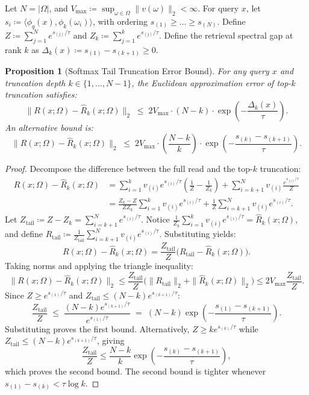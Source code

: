 \documentclass[preprint,12pt]{elsarticle}
\newtheorem{proposition}{Proposition}
\newcommand{\Om}{\Omega}
\begin{document}
Let $N = |\Om|$, and $V_{\max} \coloneqq \sup_{\omega \in \Om} \|v(\omega)\|_2 < \infty$. For query $x$, let $s_i \coloneqq \langle \phi_q(x), \phi_k(\omega_i) \rangle$, with ordering $s_{(1)} \ge \dots \ge s_{(N)}$. Define $Z \coloneqq \sum_{j=1}^N e^{s_{(j)}/\tau}$ and $Z_k \coloneqq \sum_{j=1}^k e^{s_{(j)}/\tau}$. Define the retrieval spectral gap at rank $k$ as $\Delta_k(x) \coloneqq s_{(1)} - s_{(k+1)} \ge 0$.

\begin{proposition}[Softmax Tail Truncation Error Bound]
\label{thm:quadrature_bound}
For any query $x$ and truncation depth $k \in \{1, \dots, N-1\}$, the Euclidean approximation error of top-$k$ truncation satisfies:
\[
  \| R(x; \Om) - \hat{R}_k(x; \Om) \|_2 \;\le\; 2 V_{\max} \cdot (N - k) \cdot \exp\left( -\frac{\Delta_k(x)}{\tau} \right).
\]
An alternative bound is:
\[
  \| R(x; \Om) - \hat{R}_k(x; \Om) \|_2 \;\le\; 2 V_{\max} \cdot \left(\frac{N - k}{k}\right) \cdot \exp\left( -\frac{s_{(k)} - s_{(k+1)}}{\tau} \right).
\]
\end{proposition}

\begin{proof}
Decompose the difference between the full read and the top-$k$ truncation:
\begin{align*}
  R(x; \Om) - \hat{R}_k(x; \Om) 
  &= \sum_{i=1}^k v_{(i)} e^{s_{(i)}/\tau} \left( \frac{1}{Z} - \frac{1}{Z_k} \right) + \sum_{i=k+1}^N v_{(i)} \frac{e^{s_{(i)}/\tau}}{Z} \\
  &= \frac{Z_k - Z}{Z Z_k} \sum_{i=1}^k v_{(i)} e^{s_{(i)}/\tau} + \frac{1}{Z} \sum_{i=k+1}^N v_{(i)} e^{s_{(i)}/\tau}.
\end{align*}
Let $Z_{\mathrm{tail}} \coloneqq Z - Z_k = \sum_{i=k+1}^N e^{s_{(i)}/\tau}$. Notice $\frac{1}{Z_k} \sum_{i=1}^k v_{(i)} e^{s_{(i)}/\tau} = \hat{R}_k(x; \Om)$, and define $R_{\mathrm{tail}} \coloneqq \frac{1}{Z_{\mathrm{tail}}} \sum_{i=k+1}^N v_{(i)} e^{s_{(i)}/\tau}$. Substituting yields:
\[
  R(x; \Om) - \hat{R}_k(x; \Om) = \frac{Z_{\mathrm{tail}}}{Z} \big( R_{\mathrm{tail}} - \hat{R}_k(x; \Om) \big).
\]
Taking norms and applying the triangle inequality:
\[
  \| R(x; \Om) - \hat{R}_k(x; \Om) \|_2 
  \le \frac{Z_{\mathrm{tail}}}{Z} \big( \|R_{\mathrm{tail}}\|_2 + \|\hat{R}_k(x; \Om)\|_2 \big) 
  \le 2 V_{\max} \frac{Z_{\mathrm{tail}}}{Z}.
\]
Since $Z \ge e^{s_{(1)}/\tau}$ and $Z_{\mathrm{tail}} \le (N - k) e^{s_{(k+1)}/\tau}$:
\[
  \frac{Z_{\mathrm{tail}}}{Z} \;\le\; \frac{(N - k) e^{s_{(k+1)}/\tau}}{e^{s_{(1)}/\tau}} \;=\; (N - k) \exp\left( -\frac{s_{(1)} - s_{(k+1)}}{\tau} \right).
\]
Substituting proves the first bound. Alternatively, $Z \ge k e^{s_{(k)}/\tau}$ while $Z_{\mathrm{tail}} \le (N-k) e^{s_{(k+1)}/\tau}$, giving
\[
  \frac{Z_{\mathrm{tail}}}{Z} \le \frac{N-k}{k}\exp\left(-\frac{s_{(k)}-s_{(k+1)}}{\tau}\right),
\]
which proves the second bound. The second bound is tighter whenever $s_{(1)} - s_{(k)} < \tau \log k$.
\end{proof}
\end{document}
